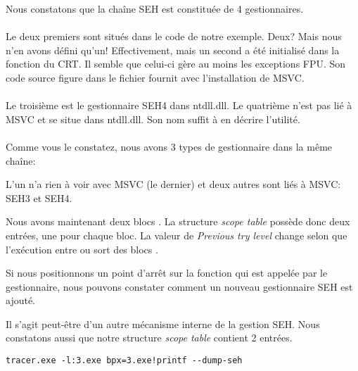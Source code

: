 Nous constatons que la chaîne SEH est constituée de 4 gestionnaires.\\
\\
Le deux premiers sont situés dans le code de notre exemple. Deux? Mais nous n'en avons défini qu'un!
Effectivement, mais un second a été initialisé dans la fonction  du \ac{CRT}.
Il semble que celui-ci gère au moins les exceptions \ac{FPU}.
Son code source figure dans le fichier  fournit avec l'installation de MSVC.\\
\\
Le troisième est le gestionnaire SEH4 dans ntdll.dll.
Le quatrième n'est pas lié à MSVC et se situe dans ntdll.dll. Son nom suffit à en décrire l'utilité.\\
\\
Comme vous le constatez, nous avons 3 types de gestionnaire dans la même chaîne:

L'un n'a rien à voir avec MSVC (le dernier) et deux autres sont liés à MSVC: SEH3 et SEH4.




Nous avons maintenant deux blocs .
La structure \emph{scope table} possède donc deux entrées, une pour chaque bloc.
La valeur de \emph{Previous try level} change selon que l'exécution entre ou sort des blocs .



Si nous positionnons un point d'arrêt sur la fonction \printf{} qui est appelée par le gestionnaire,
nous pouvons constater comment un nouveau gestionnaire SEH est ajouté.

Il s'agit peut-être d'un autre mécanisme interne de la gestion SEH.
Nous constatons aussi que notre structure \emph{scope table} contient 2 entrées.

\begin{lstlisting}
tracer.exe -l:3.exe bpx=3.exe!printf --dump-seh
\end{lstlisting}

